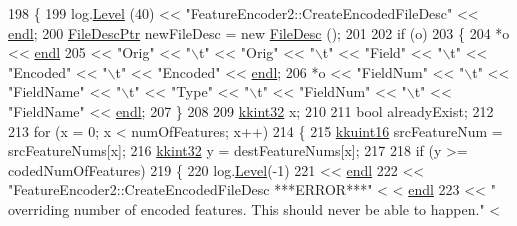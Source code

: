 \begin{DoxyCode}
198 \{
199   log.\hyperlink{class_k_k_b_1_1_run_log_a32cf761d7f2e747465fd80533fdbb659}{Level} (40) << \textcolor{stringliteral}{"FeatureEncoder2::CreateEncodedFileDesc"} << \hyperlink{namespace_k_k_b_ad1f50f65af6adc8fa9e6f62d007818a8}{endl};
200   \hyperlink{class_k_k_m_l_l_1_1_file_desc}{FileDescPtr}  newFileDesc = \textcolor{keyword}{new} \hyperlink{class_k_k_m_l_l_1_1_file_desc}{FileDesc} ();
201 
202   \textcolor{keywordflow}{if}  (o)
203   \{
204     *o << \hyperlink{namespace_k_k_b_ad1f50f65af6adc8fa9e6f62d007818a8}{endl} 
205         << \textcolor{stringliteral}{"Orig"}    << \textcolor{stringliteral}{"\(\backslash\)t"} << \textcolor{stringliteral}{"Orig"}      << \textcolor{stringliteral}{"\(\backslash\)t"} << \textcolor{stringliteral}{"Field"} << \textcolor{stringliteral}{"\(\backslash\)t"} << \textcolor{stringliteral}{"Encoded"}  << \textcolor{stringliteral}{"\(\backslash\)t"} << \textcolor{stringliteral}{"Encoded"}  
       << \hyperlink{namespace_k_k_b_ad1f50f65af6adc8fa9e6f62d007818a8}{endl};
206     *o << \textcolor{stringliteral}{"FieldNum"} << \textcolor{stringliteral}{"\(\backslash\)t"} << \textcolor{stringliteral}{"FieldName"} << \textcolor{stringliteral}{"\(\backslash\)t"} << \textcolor{stringliteral}{"Type"}  << \textcolor{stringliteral}{"\(\backslash\)t"} << \textcolor{stringliteral}{"FieldNum"} << \textcolor{stringliteral}{"\(\backslash\)t"} << \textcolor{stringliteral}{"FieldName"}
       << \hyperlink{namespace_k_k_b_ad1f50f65af6adc8fa9e6f62d007818a8}{endl};
207   \}
208 
209   \hyperlink{namespace_k_k_b_a8fa4952cc84fda1de4bec1fbdd8d5b1b}{kkint32}  x;
210 
211   \textcolor{keywordtype}{bool}  alreadyExist;
212   
213   \textcolor{keywordflow}{for}  (x = 0;  x < numOfFeatures; x++)
214   \{
215     \hyperlink{namespace_k_k_b_aa8c7d4d30381c8a0b6fce68974a9c8a9}{kkuint16}  srcFeatureNum = srcFeatureNums[x];
216     \hyperlink{namespace_k_k_b_a8fa4952cc84fda1de4bec1fbdd8d5b1b}{kkint32}  y = destFeatureNums[x];
217 
218     \textcolor{keywordflow}{if}  (y >= codedNumOfFeatures)
219     \{
220       log.\hyperlink{class_k_k_b_1_1_run_log_a32cf761d7f2e747465fd80533fdbb659}{Level}(-1) 
221             << \hyperlink{namespace_k_k_b_ad1f50f65af6adc8fa9e6f62d007818a8}{endl}
222             << \textcolor{stringliteral}{"FeatureEncoder2::CreateEncodedFileDesc     ***ERROR***"}                                   <
      < \hyperlink{namespace_k_k_b_ad1f50f65af6adc8fa9e6f62d007818a8}{endl}
223             << \textcolor{stringliteral}{"             overriding number of encoded features. This should never be able to happen."} <

\end{DoxyCode}
